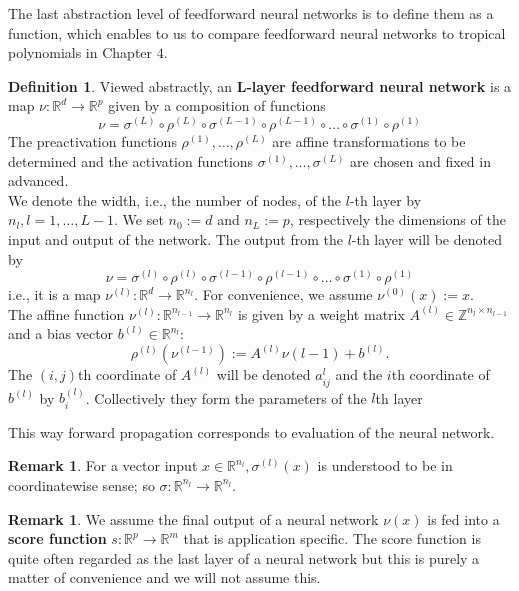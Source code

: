 \documentclass{article}
\theoremstyle{definition}
\newtheorem{definition}[theorem]{Definition}
\newtheorem{remark}[theorem]{Remark}
\begin{document}
The last abstraction level of feedforward neural networks is to define them as a function, which enables to us to compare feedforward neural networks to tropical polynomials in Chapter $4$.

\begin{definition}\cite{zhang2018tropical}
Viewed abstractly, an \textbf{L-layer feedforward neural network} is a map $\nu : \mathbb{R}^{d} \to \mathbb{R}^{p}$ given by a composition of functions
$$ \nu = \sigma^{(L)} \circ \rho^{(L)} \circ \sigma^{(L-1)} \circ \rho^{(L-1)} \circ \dots \circ \sigma^{(1)} \circ \rho^{(1)}$$
The preactivation functions $\rho^{(1)}, \dots , \rho^{(L)}$ are affine transformations to be determined and the activation functions $\sigma^{(1)}, \dots , \sigma^{(L)}$ are chosen and fixed in advanced. \\
We denote the width, i.e., the number of nodes, of the $l$-th
layer by $n_l, l = 1, \dots , L-1$. We set $n_0 := d$ and $n_L := p$, respectively the dimensions of the input and output of the network. The output from the $l$-th layer will be denoted by
$$\nu = \sigma^{(l)} \circ \rho^{(l)} \circ \sigma^{(l-1)} \circ \rho^{(l-1)} \circ \dots \circ \sigma^{(1)} \circ \rho^{(1)}$$
i.e., it is a map $\nu^{(l)} : \mathbb{R}^{d} \to \mathbb{R}^{n_l}$. For convenience, we assume $\nu^{(0)}(x) := x$. \\
The affine function $\nu^{(l)} : \mathbb{R}^{n_{l-1}} \to \mathbb{R}^{n_{l}}$ is given by a weight matrix $A^{(l)} \in \mathbb{Z}^{n_l \times n_{l-1}} $ and a bias vector $b^{(l)} \in \mathbb{R}^{n_l}$:
$$ \rho^{(l)}(\nu^{(l-1)}) := A^{(l)} \nu{(l-1)} + b^{(l)}. $$
The $(i, j)$th coordinate of $A^{(l)}$ will be denoted $a^{l}_{ij}$ and the $i$th coordinate of $b^{(l)}$ by $b^{(l)}_{i}$. Collectively they form the parameters of the $l$th layer
\end{definition}

This way forward propagation corresponds to evaluation of the neural network.

\begin{remark}\cite{zhang2018tropical}
For a vector input $x \in \mathbb{R}^{n_l}, \sigma^{(l)}(x)$ is understood to be in coordinatewise sense; so $\sigma : \mathbb{R}^{n_l} \to \mathbb{R}^{n_l}$.
\end{remark}
\begin{remark}\cite{zhang2018tropical}
We assume the final output of a neural network $\nu(x)$ is fed into a \textbf{score function} $s : \mathbb{R}^{p} \to \mathbb{R}^{m}$ that is application specific. The score function is quite often regarded as the last layer of a neural network but this is purely a matter of convenience and we will not assume this.
\end{remark}
\end{document}
